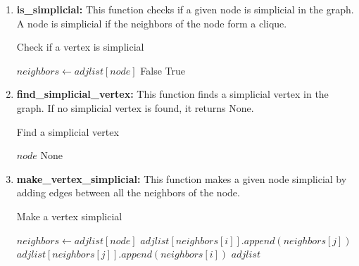 \documentclass[12pt]{article}
\begin{document}
\begin{enumerate}
    \item \textbf{is\_simplicial:} This function checks if a given node is simplicial in the graph. A node is simplicial if the neighbors of the node form a clique.
    
    \begin{algorithm}
        \caption{Check if a vertex is simplicial}
        \begin{algorithmic}[1]
            \State $neighbors \gets adjlist[node]$
                        \State \Return False
                    \EndIf
                \EndFor
            \EndFor
            \State \Return True
        \EndFunction
        \end{algorithmic}
    \end{algorithm}

    \item \textbf{find\_simplicial\_vertex:} This function finds a simplicial vertex in the graph. If no simplicial vertex is found, it returns None.
    
    \begin{algorithm}
        \caption{Find a simplicial vertex}
        \begin{algorithmic}[1]
                    \State \Return $node$
                \EndIf
            \EndFor
            \State \Return None
        \EndFunction
        \end{algorithmic}
    \end{algorithm}

    \item \textbf{make\_vertex\_simplicial:} This function makes a given node simplicial by adding edges between all the neighbors of the node.
    
    \begin{algorithm}
        \caption{Make a vertex simplicial}
        \begin{algorithmic}[1]
            \State $neighbors \gets adjlist[node]$
                        \State $adjlist[neighbors[i]].append(neighbors[j])$
                        \State $adjlist[neighbors[j]].append(neighbors[i])$
                    \EndIf
                \EndFor
            \EndFor
            \State \Return $adjlist$
        \EndFunction
        \end{algorithmic}
    \end{algorithm}


\end{enumerate}
\end{document}
